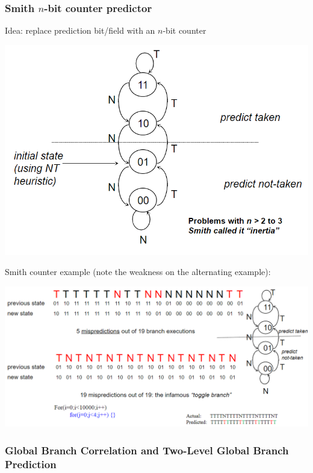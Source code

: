\documentclass[12pt]{extarticle}
\begin{document}
	\subsubsection{Smith $n$-bit counter predictor}

	Idea: replace prediction bit/field with an $n$-bit counter

	\begin{center}
		\includegraphics[scale=0.5]{assets/smith-counter.png}
	\end{center}

	\noindent Smith counter example (note the weakness on the alternating example):

	\begin{center}
		\includegraphics[scale=0.6]{assets/smith-example.png}
	\end{center}

	\subsubsection{Global Branch Correlation and Two-Level Global Branch Prediction}
\end{document}
